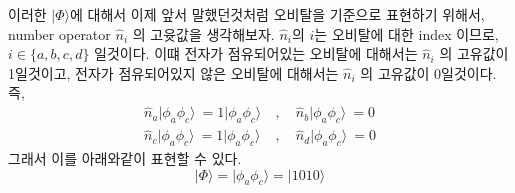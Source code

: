 \documentclass[11pt]{article}
\begin{document}
이러한 \(| \Phi \rangle\)에 대해서 이제 앞서 말했던것처럼 오비탈을 기준으로 표현하기 위해서, number operator \(\hat{n}_i\) 의 고윳값을 생각해보자. \(\hat{n}_i\)의 \(i\)는 오비탈에 대한 index 이므로, 
\(i \in \{a,b,c,d\}\) 일것이다. 이떄 전자가 점유되어있는 오비탈에 대해서는 \(\hat{n}_i\) 의 고유값이 1일것이고, 전자가 점유되어있지 않은 오비탈에 대해서는 \(\hat{n}_i\) 의 고유값이 0일것이다. 
즉, 
\begin{align*}
\hat{n}_a \vert \phi_a \phi_c \rangle\ = 1\vert \phi_a \phi_c \rangle\ &,\quad \hat{n}_b \vert \phi_a \phi_c \rangle\ = 0 \\
\hat{n}_c \vert \phi_a \phi_c \rangle\ = 1\vert \phi_a \phi_c \rangle\ &,\quad \hat{n}_d \vert \phi_a \phi_c \rangle\ = 0 
\end{align*}
그래서 이를 아래와같이 표현할 수 있다. 
\[| \Phi \rangle  = \vert \phi_a \phi_c \rangle = \vert 1010 \rangle  \] 
\end{document}
